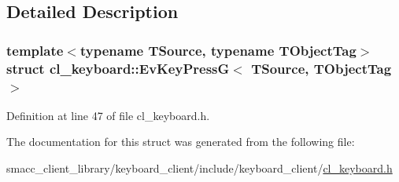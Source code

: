 \subsection{Detailed Description}
\subsubsection*{template$<$typename T\+Source, typename T\+Object\+Tag$>$\newline
struct cl\+\_\+keyboard\+::\+Ev\+Key\+Press\+G$<$ T\+Source, T\+Object\+Tag $>$}



Definition at line 47 of file cl\+\_\+keyboard.\+h.



The documentation for this struct was generated from the following file\+:\begin{DoxyCompactItemize}
\item 
smacc\+\_\+client\+\_\+library/keyboard\+\_\+client/include/keyboard\+\_\+client/\hyperlink{cl__keyboard_8h}{cl\+\_\+keyboard.\+h}\end{DoxyCompactItemize}
